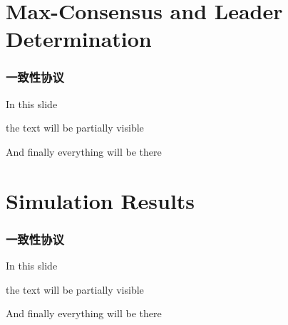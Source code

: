 \documentclass{beamer}
\begin{document}
\section{Max-Consensus and Leader Determination}

\begin{frame}
\frametitle{一致性协议}

    In this slide %
    
    the text will be partially visible %
    
    And finally everything will be there

\end{frame}

\section{Simulation Results}

\begin{frame}
\frametitle{一致性协议}

    In this slide %
    
    the text will be partially visible %
    
    And finally everything will be there

\end{frame}
\end{document}
